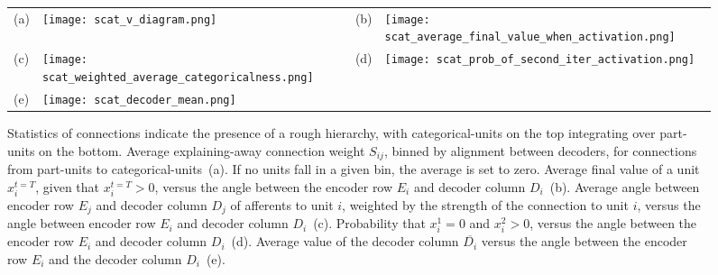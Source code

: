 \documentclass{article} %
\begin{document}
\begin{figure}[ptb] %
  \begin{center}
    \begin{tabular}{p{0.04in}p{2.4in}p{0.04in}p{2.4in}}
      \parbox[b]{0in}{(a) \vspace{3.8cm}} & \texttt{[image: scat\_v\_diagram.png]} &
      \parbox[b]{0in}{(b) \vspace{3.8cm}} & \texttt{[image: scat\_average\_final\_value\_when\_activation.png]} \\
      \parbox[b]{0in}{(c) \vspace{3.8cm}} & \texttt{[image: scat\_weighted\_average\_categoricalness.png]} &
      \parbox[b]{0in}{(d) \vspace{3.8cm}} & \texttt{[image: scat\_prob\_of\_second\_iter\_activation.png]} \\
      \parbox[b]{0in}{(e) \vspace{3.8cm}} & \texttt{[image: scat\_decoder\_mean.png]}
    \end{tabular}
  \end{center}
  \caption{Statistics of connections indicate the presence of a rough hierarchy, with categorical-units on the top integrating %
    over part-units on the bottom. Average explaining-away connection weight $S_{ij}$, binned by alignment between decoders, for connections from part-units to categorical-units~(a).  If no units fall in a given bin, the average is set to zero. Average final value of a unit $x_i^{t = T}$, given that $x_i^{t=T} > 0$, versus the angle between the encoder row $E_i$ and decoder column $D_i$~(b).  Average angle between encoder row $E_j$ and decoder column $D_j$ of afferents to unit $i$, weighted by the strength of the connection to unit $i$, versus the angle between encoder row $E_i$ and decoder column $D_i$~(c). Probability that $x_i^1 = 0$ and $x_i^2 > 0$, versus the angle between the encoder row $E_i$ and decoder column $D_i$~(d).  Average value of the decoder column $\overline{D_i}$ versus the angle between the encoder row $E_i$ and the decoder column $D_i$~(e). \label{categorical_connection_statistics_figure}}  
\end{figure}

\begin{comment}
\begin{figure}[ptb] %
  \begin{center}
    \begin{tabular}{cc}
      \texttt{[image: scat\_decoder\_mean.png]} &
      \texttt{[image: scat\_class\_dict\_mag\_versus\_final\_activation.png]}
    \end{tabular}
  \end{center}
  \caption{Statistics for interpretation. \label{interpretation_statistics_figure}}
\end{figure}
\end{comment}
\end{document}
